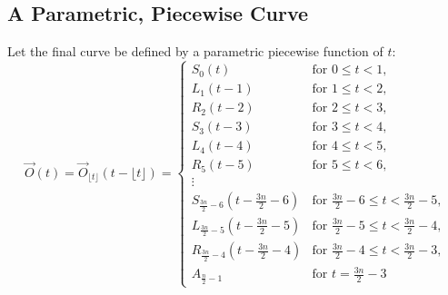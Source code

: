 \documentclass{article}
\begin{document}
\subsection{A Parametric, Piecewise Curve}
\label{subsec:definition_of_curve}
Let the final curve be defined by a parametric piecewise function of $t$:
\begin{equation}
    \label{eq:O(t)}
\overrightarrow{O}(t) = \overrightarrow{O}_{\lfloor t \rfloor}(t - \lfloor t \rfloor) = \begin{cases}
S_0(t) & \text{for } 0 \leq t < 1, \\
L_1(t - 1) & \text{for } 1 \leq t < 2, \\
R_2(t - 2) & \text{for } 2 \leq t < 3, \\
S_3(t - 3) & \text{for } 3 \leq t < 4, \\
L_4(t - 4) & \text{for } 4 \leq t < 5, \\
R_5(t - 5) & \text{for } 5 \leq t < 6, \\
\vdots & \\
S_{\frac{3n}{2}-6}(t - \frac{3n}{2}-6) & \text{for } \frac{3n}{2}-6 \leq t < \frac{3n}{2}-5, \\
L_{\frac{3n}{2}-5}(t - \frac{3n}{2}-5) & \text{for } \frac{3n}{2}-5 \leq t < \frac{3n}{2}-4, \\
R_{\frac{3n}{2}-4}(t - \frac{3n}{2}-4) & \text{for } \frac{3n}{2}-4 \leq t < \frac{3n}{2}-3, \\
A_{\frac{n}{2}-1} & \text{for } t = \frac{3n}{2}-3
\end{cases}
\end{equation}
\end{document}
